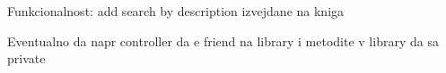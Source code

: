 Funkcionalnost\+: add search by description izvejdane na kniga

Eventualno da napr controller da e friend na library i metodite v library da sa private 